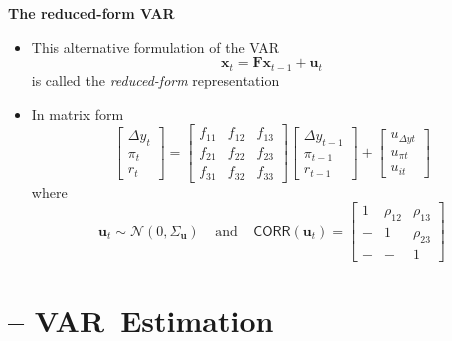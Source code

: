\documentclass[10pt,handout]{beamer}
\begin{document}
\vspace{0.1cm}

\begin{frame}
{\textbf{The reduced-form VAR}}

\begin{itemize}
\item This alternative formulation of the VAR%
\begin{equation*}
\mathbf{x}_{t}=\mathbf{Fx}_{t-1}+\mathbf{u}_{t}
\end{equation*}%
is called the \emph{reduced-form} representation\medskip \pause

\item In matrix form%
\begin{equation*}
\begin{bmatrix}
\Delta y_{t} \\ 
\pi _{t} \\ 
r_{t}%
\end{bmatrix}%
=\left[ 
\begin{array}{ccc}
f_{11} & f_{12} & f_{13} \\ 
f_{21} & f_{22} & f_{23} \\ 
f_{31} & f_{32} & f_{33}%
\end{array}%
\right] 
\begin{bmatrix}
\Delta y_{t-1} \\ 
\pi _{t-1} \\ 
r_{t-1}%
\end{bmatrix}%
+%
\begin{bmatrix}
u_{\Delta yt} \\ 
u_{\pi t} \\ 
u_{it}%
\end{bmatrix}%
\end{equation*}%
where%
\begin{equation*}
\mathbf{u}_{t}\sim \mathcal{N}(0,\Sigma _{\mathbf{u}})\ \ \ \ \ \text{and}\
\ \ \ \ \mathsf{CORR}(\mathbf{u}_{t})=\left[ 
\begin{array}{ccc}
1 & \rho _{12} & \rho _{13} \\ 
- & 1 & \rho _{23} \\ 
- & - & 1%
\end{array}%
\right]
\end{equation*}
\end{itemize}
\end{frame}

\vspace{.1cm}

\section{ -- VAR\ Estimation}
\end{document}
